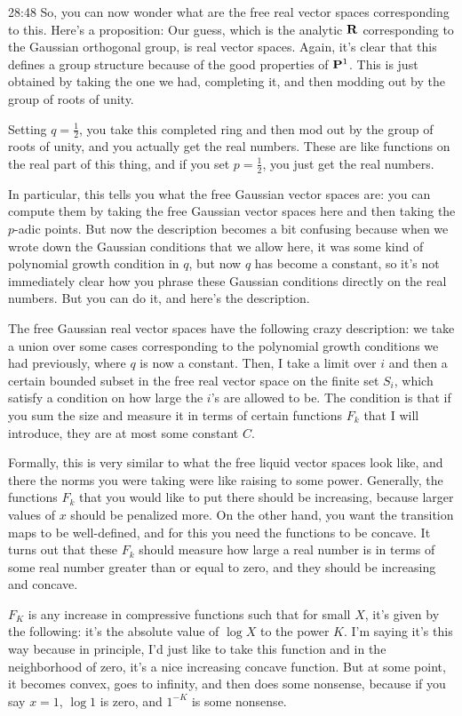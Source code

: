 \begin{unfinished}{28:48}
So, you can now wonder what are the free real vector spaces corresponding to this. Here's a proposition: Our guess, which is the analytic $\R$ corresponding to the Gaussian orthogonal group, is real vector spaces. Again, it's clear that this defines a group structure because of the good properties of $\P^1$. This is just obtained by taking the one we had, completing it, and then modding out by the group of roots of unity.

Setting $q = \frac{1}{2}$, you take this completed ring and then mod out by the group of roots of unity, and you actually get the real numbers. These are like functions on the real part of this thing, and if you set $p = \frac{1}{2}$, you just get the real numbers.

In particular, this tells you what the free Gaussian vector spaces are: you can compute them by taking the free Gaussian vector spaces here and then taking the
$p$-adic points. But now the description becomes a bit confusing because when we wrote down the Gaussian conditions that we allow here, it was some kind of polynomial growth condition in $q$, but now $q$ has become a constant, so it's not immediately clear how you phrase these Gaussian conditions directly on the real numbers. But you can do it, and here's the description.

The free Gaussian real vector spaces have the following crazy description: we take a union over some cases corresponding to the polynomial growth conditions we had previously, where $q$ is now a constant. Then, I take a limit over $i$ and then a certain bounded subset in the free real vector space on the finite set $S_i$, which satisfy a condition on how large the $i$'s are allowed to be. The condition is that if you sum the size and measure it in terms of certain functions $F_k$ that I will introduce, they are at most some constant $C$.

Formally, this is very similar to what the free liquid vector spaces look like, and there the norms you were taking were like raising to some power. Generally, the functions $F_k$ that you would like to put there should be increasing, because larger values of $x$ should be penalized more. On the other hand, you want the transition maps to be well-defined, and for this you need the functions to be concave. It turns out that these $F_k$ should measure how large a real number is in terms of some real number greater than or equal to zero, and they should be increasing and concave.


$F_K$ is any increase in compressive functions such that for small $X$, it's given by the following: it's the absolute value of $\log X$ to the power $K$. I'm saying it's this way because in principle, I'd just like to take this function and in the neighborhood of zero, it's a nice increasing concave function. But at some point, it becomes convex, goes to infinity, and then does some nonsense, because if you say $x = 1$, $\log 1$ is zero, and $1^{-K}$ is some nonsense. 


\end{unfinished}
